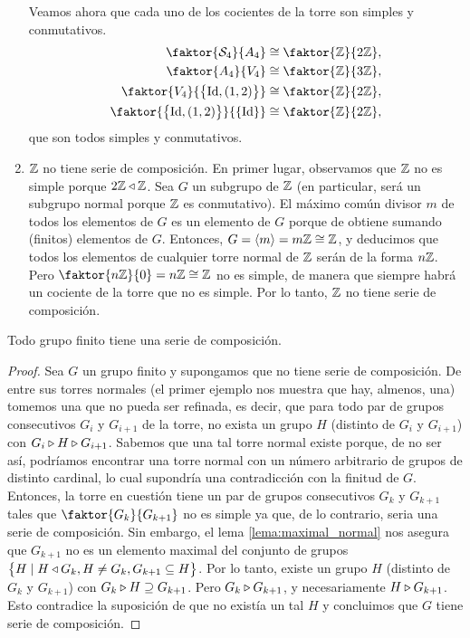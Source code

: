 \begin{example}
\begin{enumerate}[1.]
            \noindent Veamos ahora que cada uno de los cocientes de la torre son simples y conmutativos. 
            \begin{align*}
                \faktor{\Sim_4}{A_4} &\cong \faktor{\z}{2\z},\\
                \faktor{A_4}{V_4} &\cong \faktor{\z}{3\z},\\
                \faktor{V_4}{\lc \Id,\lp 1,2\rp\rc} &\cong \faktor{\z}{2\z},\\
                \faktor{\lc \Id,\lp 1,2\rp\rc}{\lc\Id\rc} &\cong \faktor{\z}{2\z},
            \end{align*}
            que son todos simples y conmutativos.
        \item $\mathbb{Z}$ no tiene serie de composición. En primer lugar, observamos que $\mathbb{Z}$ no es simple porque $2\mathbb{Z}\triangleleft\mathbb{Z}$. Sea $G$ un subgrupo de $\mathbb{Z}$ (en particular, será un subgrupo normal porque $\mathbb{Z}$ es conmutativo). El máximo común divisor $m$ de todos los elementos de $G$ es un elemento de $G$ porque de obtiene sumando (finitos) elementos de $G$. Entonces, $G=\left< m\right>=m\mathbb{Z}\cong\mathbb{Z}$, y deducimos que todos los elementos de cualquier torre normal de $\mathbb{Z}$ serán de la forma $n\mathbb{Z}$. Pero $\faktor{n\z}{0}=n\z\cong\z$ no es simple, de manera que siempre habrá un cociente de la torre que no es simple. Por lo tanto, $\mathbb{Z}$ no tiene serie de composición.
    \end{enumerate}
\end{example}

\begin{prop}
    Todo grupo finito tiene una serie de composición.
\end{prop}

\begin{proof}
    Sea $G$ un grupo finito y supongamos que no tiene serie de composición. De entre sus torres normales (el primer ejemplo nos muestra que hay, almenos, una) tomemos una que no pueda ser refinada, es decir, que para todo par de grupos consecutivos $G_i$ y $G_{i+1}$ de la torre, no exista un grupo $H$ (distinto de $G_i$ y $G_{i+1}$) con $G_i\triangleright H\triangleright G_{i+1}$. Sabemos que una tal torre normal existe porque, de no ser así, podríamos encontrar una torre normal con un número arbitrario de grupos de distinto cardinal, lo cual supondría una contradicción con la finitud de $G$. Entonces, la torre en cuestión tiene un par de grupos consecutivos $G_k$ y $G_{k+1}$ tales que $\faktor{G_k}{G_{k+1}}$ no es simple ya que, de lo contrario, seria una serie de composición. Sin embargo, el lema \ref{lema:maximal_normal} nos asegura que $G_{k+1}$ no es un elemento maximal del conjunto de grupos $\left\{ H\mid H\triangleleft G_k, H\neq G_k, G_{k+1}\subseteq H\right\}$. Por lo tanto, existe un grupo $H$ (distinto de $G_k$ y $G_{k+1}$) con $G_k\triangleright H\supseteq G_{k+1}$. Pero $G_k\triangleright G_{k+1}$, y necesariamente $H\triangleright G_{k+1}$. Esto contradice la suposición de que no existía un tal $H$ y concluimos que $G$ tiene serie de composición.
\end{proof}

